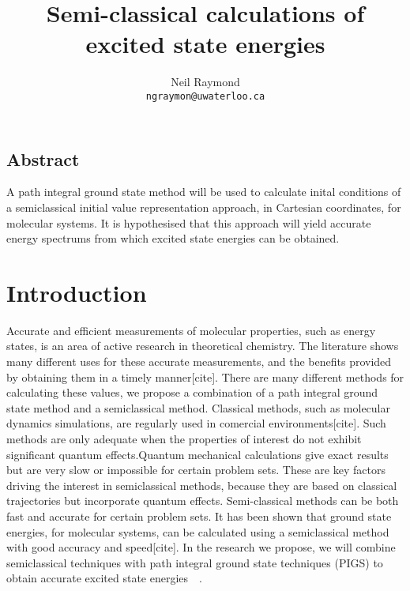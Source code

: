 \documentclass[12pt,letterpaper,oneside,final,titlepage]{article}               %
\numberwithin{equation}{section} %
\begin{document}
	\title{Semi-classical calculations of excited state energies}
	\author{Neil Raymond
	       \\ \texttt{ngraymon@uwaterloo.ca}}
    \date{}
    \maketitle

\doublespacing

\subsection*{Abstract}
A path integral ground state method will be used to calculate inital conditions of a semiclassical initial value representation approach, in Cartesian coordinates, 
for molecular systems. It is hypothesised that this approach will yield accurate energy spectrums from which excited state energies can be obtained. 


\section{Introduction}
Accurate and efficient measurements of molecular properties, such as energy states, is an area of active research in theoretical chemistry. The literature shows many different uses for these accurate measurements, and the benefits provided by obtaining them in a timely manner[cite]. There are many different methods for calculating these values, we propose a combination of a path integral ground state method and a semiclassical method. Classical methods, such as molecular dynamics simulations, are regularly used in comercial environments[cite]. Such methods are only adequate when the properties of interest do not exhibit significant quantum effects.Quantum mechanical calculations give exact results but are very slow or impossible for certain problem sets. These are key factors driving the interest in semiclassical methods, because they are based on classical trajectories but incorporate quantum effects. Semi-classical methods can be both fast and accurate for certain problem sets. It has been shown that ground state energies, for molecular systems, can be calculated using a semiclassical method with good accuracy and speed[cite]. In the research we propose, we will combine semiclassical techniques with path integral ground state techniques (PIGS) to obtain accurate excited state energies~\cite{issack2007semiclassical}~\cite{schmidt2014inclusion}.
\end{document}
